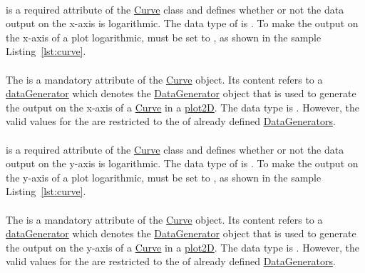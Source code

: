 \paragraph*{}
\label{sec:logX}
 is a required attribute of the \hyperref[class:curve]{Curve} class and defines whether or not the data output on the x-axis is logarithmic. The data type of  is . To make the output on the x-axis of a plot logarithmic,  must be set to , as shown in the sample Listing~\ref{lst:curve}.

\paragraph*{}
\label{sec:xDataReference}
The  is a mandatory attribute of the \hyperref[class:curve]{Curve} object. Its content refers to a \hyperref[class:dataGenerator]{dataGenerator} which denotes the \hyperref[class:dataGenerator]{DataGenerator} object that is used to generate the output on the x-axis of a \hyperref[class:curve]{Curve} in a \hyperref[class:plot2D]{plot2D}. 
The  data type is \hyperref[type:sidref]{}. However, the valid values for the  are restricted to the \hyperref[sec:id]{} of already defined \hyperref[class:dataGenerator]{DataGenerators}.

\paragraph*{}
\label{sec:logY}
 is a required attribute of the \hyperref[class:curve]{Curve} class and defines whether or not the data output on the y-axis is logarithmic. The data type of  is . To make the output on the y-axis of a plot logarithmic,  must be set to , as shown in the sample Listing~\ref{lst:curve}. 

\paragraph*{}
\label{sec:yDataReference}
The  is a mandatory attribute of the \hyperref[class:curve]{Curve} object. Its content refers to a \hyperref[class:dataGenerator]{dataGenerator} which denotes the \hyperref[class:dataGenerator]{DataGenerator} object that is used to generate the output on the y-axis of a \hyperref[class:curve]{Curve} in a \hyperref[class:plot2D]{plot2D}.
The  data type is . However, the valid values for the  are restricted to the \hyperref[sec:id]{} of already defined \hyperref[class:dataGenerator]{DataGenerators}.


